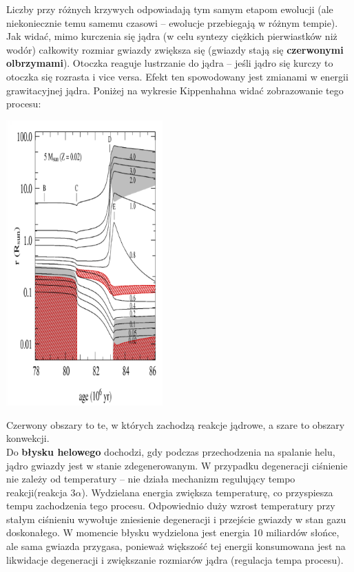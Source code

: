 \documentclass[../index.tex]{subfiles}
\begin{document}
            Liczby przy różnych krzywych odpowiadają tym samym etapom ewolucji (ale niekoniecznie temu samemu czasowi – ewolucje przebiegają w różnym tempie). Jak widać, mimo kurczenia się jądra (w celu syntezy ciężkich pierwiastków niż wodór) całkowity rozmiar gwiazdy zwiększa się (gwiazdy stają się \textbf{czerwonymi olbrzymami}). Otoczka reaguje lustrzanie do jądra – jeśli jądro się kurczy to otoczka się rozrasta i vice versa. Efekt ten spowodowany jest zmianami w energii grawitacyjnej jądra. Poniżej na wykresie Kippenhahna widać zobrazowanie tego procesu:
            \begin{center}
                \includegraphics[width=6cm]{images/ewolucjaGwiazdKippenhahn.png}
            \end{center}
            Czerwony obszary to te, w których zachodzą reakcje jądrowe, a szare to obszary konwekcji.\\
            Do \textbf{błysku helowego} dochodzi, gdy podczas przechodzenia na spalanie helu, jądro gwiazdy jest w stanie zdegenerowanym. W przypadku degeneracji ciśnienie nie zależy od temperatury – nie działa mechanizm regulujący tempo reakcji(reakcja \(3\alpha\)). Wydzielana energia zwiększa temperaturę, co przyspiesza tempu zachodzenia tego procesu. Odpowiednio duży wzrost temperatury przy stałym ciśnieniu wywołuje zniesienie degeneracji i przejście gwiazdy w stan gazu doskonałego. W momencie błysku wydzielona jest energia 10 miliardów słońce, ale sama gwiazda przygasa, ponieważ większość tej energii konsumowana jest na likwidacje degeneracji i zwiększanie rozmiarów jądra (regulacja tempa procesu).\\
\end{document}
